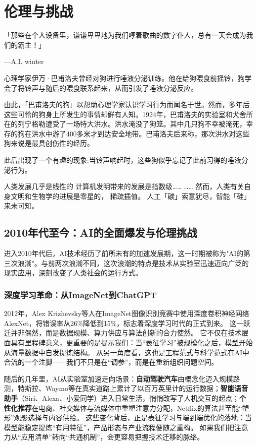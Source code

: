 \chapter{伦理与挑战}
「那些在个人设备里，谦谦卑卑地为我们哼着歌曲的数字仆人，总有一天会成为我们的霸主！」
\begin{flushright}
---A.I. winter
\end{flushright}

心理学家伊万·巴甫洛夫曾经对狗进行唾液分泌训练。他在给狗喂食前摇铃，狗学会了将铃声与随后的喂食联系起来，从而引发了唾液分泌反应。

由此，「巴甫洛夫的狗」以帮助心理学家认识学习行为而闻名于世。然而，多年后这些可怜的狗身上所发生的事情却鲜有人知。1924年，巴甫洛夫的实验室和犬舍所在的列宁格勒遭受了一场特大洪水。洪水淹没了狗笼。其中几只狗不幸被淹死，幸存的狗在洪水中游了400多米才到达安全地带。巴甫洛夫后来称，那次洪水对这些狗来说是最具创伤性的经历。

此后出现了一个有趣的现象:当铃声响起时，这些狗似乎忘记了此前习得的唾液分泌行为。

人类发展几乎是线性的
计算机发明带来的发展是指数级……
……
然而，人类有关自身文明和生物学的进展是零星的， 稀疏插值。
人工「碳」索意犹尽，智能「硅」来未可知。

\section{2010年代至今：AI的全面爆发与伦理挑战}

进入2010年代后，AI技术经历了前所未有的加速发展期，这一时期被称为"AI的第三次浪潮"。与前两次浪潮不同，这次浪潮的特点是技术从实验室迅速迈向广泛的现实应用，深刻改变了人类社会的运行方式。

\subsection{深度学习革命：从ImageNet到ChatGPT}

2012年，Alex Krizhevsky等人在ImageNet图像识别竞赛中使用深度卷积神经网络AlexNet，将错误率从26\%降低到15\%，标志着深度学习时代的正式到来。 
这一跃迁并非偶然，而是数据规模、算力供应与算法创新的合力使然。 
它不仅在技术层面具有里程碑意义，更重要的是提示我们：当“表征学习”被规模化之后，模型开始从海量数据中自发提炼结构。 
从另一角度看，这也是工程范式与科学范式在AI中合流的一个注脚——我们不只是在“调参”，而是在重新组织问题空间。

随后的几年里，AI从实验室加速走向场景：{\bf 自动驾驶汽车}由概念化迈入规模路测，特斯拉、Waymo等在真实道路上累计了以百万英里计的运行数据；{\bf 智能语音助手}（Siri、Alexa、小爱同学）进入日常生活，悄悄改写了人机交互的起点；{\bf 个性化推荐}在电商、社交媒体与流媒体中重塑注意力分配，Netflix的算法甚至能“塑形”观影选择与内容供给。 
这些变化背后，正是表征学习与端到端优化的落地：当模型能稳定提炼“有用特征”，产品形态与产业流程便随之重构。 
如果我们把注意力从“应用清单”转向“共通机制”，会更容易把握技术迁移的脉络。

